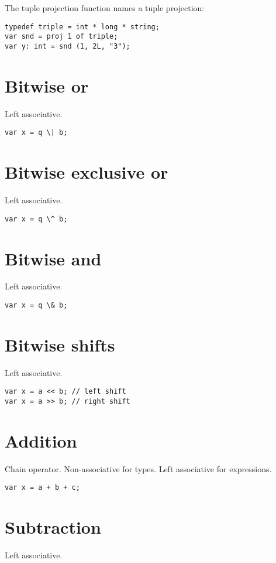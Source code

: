 \documentclass[oneside]{book}
\begin{document}
{The tuple projection function names a tuple projection:

\begin{verbatim}
typedef triple = int * long * string;
var snd = proj 1 of triple;
var y: int = snd (1, 2L, "3");
\end{verbatim}


\section{Bitwise or}
Left associative.

\begin{verbatim}
var x = q \| b;
\end{verbatim}


\section{Bitwise exclusive or}
Left associative.

\begin{verbatim}
var x = q \^ b;
\end{verbatim}


\section{Bitwise and}
Left associative.

\begin{verbatim}
var x = q \& b;
\end{verbatim}


\section{Bitwise shifts}
Left associative.

\begin{verbatim}
var x = a << b; // left shift
var x = a >> b; // right shift
\end{verbatim}


\section{Addition}
Chain operator. Non-associative for types. 
Left associative for expressions.

\begin{verbatim}
var x = a + b + c;
\end{verbatim}


\section{Subtraction}
Left associative.

}
\end{document}
